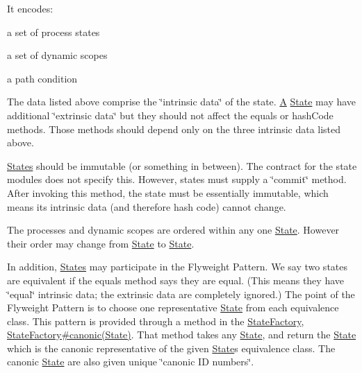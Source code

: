 It encodes\+:


\begin{DoxyItemize}
\item a set of process states 
\item a set of dynamic scopes 
\item a path condition 
\end{DoxyItemize}

The data listed above comprise the \char`\"{}intrinsic data\char`\"{} of the state. \hyperlink{structA}{A} \hyperlink{interfaceedu_1_1udel_1_1cis_1_1vsl_1_1civl_1_1state_1_1IF_1_1State}{State} may have additional \char`\"{}extrinsic data\char`\"{} but they should not affect the equals or hash\+Code methods. Those methods should depend only on the three intrinsic data listed above.

\hyperlink{classedu_1_1udel_1_1cis_1_1vsl_1_1civl_1_1state_1_1IF_1_1States}{States} should be immutable (or something in between). The contract for the state modules does not specify this. However, states must supply a \char`\"{}commit\char`\"{} method. After invoking this method, the state must be essentially immutable, which means its intrinsic data (and therefore hash code) cannot change.

The processes and dynamic scopes are ordered within any one \hyperlink{interfaceedu_1_1udel_1_1cis_1_1vsl_1_1civl_1_1state_1_1IF_1_1State}{State}. However their order may change from \hyperlink{interfaceedu_1_1udel_1_1cis_1_1vsl_1_1civl_1_1state_1_1IF_1_1State}{State} to \hyperlink{interfaceedu_1_1udel_1_1cis_1_1vsl_1_1civl_1_1state_1_1IF_1_1State}{State}.

In addition, \hyperlink{classedu_1_1udel_1_1cis_1_1vsl_1_1civl_1_1state_1_1IF_1_1States}{States} may participate in the Flyweight Pattern. We say two states are equivalent if the {\ttfamily equals} method says they are equal. (This means they have \char`\"{}equal\char`\"{} intrinsic data; the extrinsic data are completely ignored.) The point of the Flyweight Pattern is to choose one representative \hyperlink{interfaceedu_1_1udel_1_1cis_1_1vsl_1_1civl_1_1state_1_1IF_1_1State}{State} from each equivalence class. This pattern is provided through a method in the \hyperlink{interfaceedu_1_1udel_1_1cis_1_1vsl_1_1civl_1_1state_1_1IF_1_1StateFactory}{State\+Factory}, \hyperlink{}{State\+Factory\#canonic(\+State)}. That method takes any \hyperlink{interfaceedu_1_1udel_1_1cis_1_1vsl_1_1civl_1_1state_1_1IF_1_1State}{State}, and return the \hyperlink{interfaceedu_1_1udel_1_1cis_1_1vsl_1_1civl_1_1state_1_1IF_1_1State}{State} which is the canonic representative of the given \hyperlink{interfaceedu_1_1udel_1_1cis_1_1vsl_1_1civl_1_1state_1_1IF_1_1State}{State}\textquotesingle{}s equivalence class. The canonic \hyperlink{interfaceedu_1_1udel_1_1cis_1_1vsl_1_1civl_1_1state_1_1IF_1_1State}{State} are also given unique \char`\"{}canonic I\+D numbers\char`\"{}.

